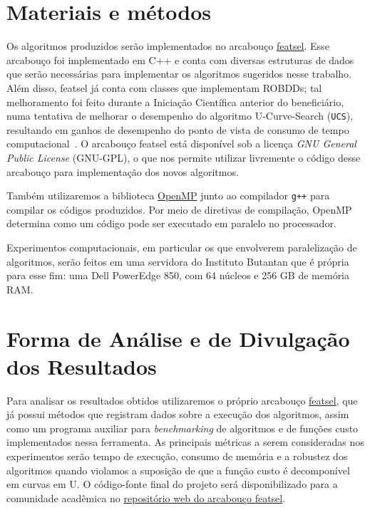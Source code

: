 \documentclass[12pt]{article}
\begin{document}
\section{Materiais e métodos}
Os algoritmos produzidos serão implementados no arcabouço \href{https://github.com/msreis/featsel}{featsel}. Esse arcabouço foi implementado em C++ e conta com diversas estruturas de dados que serão necessárias para implementar os
algoritmos sugeridos nesse trabalho. Além disso, featsel já conta com classes que implementam ROBDDs; tal melhoramento foi feito durante a Iniciação Científica anterior do beneficiário, numa tentativa de melhorar o desempenho do algoritmo U-Curve-Search ({\tt UCS}), resultando em ganhos de desempenho do ponto de vista de consumo de tempo computacional~\cite{ucsrobdd ic}. O arcabouço featsel está disponível sob a licença \textit{GNU General Public License} (GNU-GPL), o que nos permite utilizar livremente o código desse arcabouço para implementação dos novos algoritmos. 

Também utilizaremos a biblioteca \href{http://www.openmp.org/}{OpenMP} junto ao compilador {\tt g++} para compilar os códigos produzidos. Por meio de diretivas de compilação, OpenMP determina como um código pode ser executado em paralelo no processador.

Experimentos computacionais, em particular os que envolverem paralelização de algoritmos, serão feitos em uma servidora do Instituto Butantan que é própria para esse fim: uma Dell PowerEdge 850, com 64 núcleos e 256 GB de memória RAM.


\section{Forma de Análise e de Divulgação dos Resultados}

Para analisar os resultados obtidos utilizaremos o próprio arcabouço \href{https://github.com/msreis/featsel}{featsel}, que já possui métodos que registram dados sobre a execução dos algoritmos, assim como um programa auxiliar para {\em benchmarking} de algoritmos e de funções custo implementados nessa ferramenta. As principais métricas a serem consideradas nos experimentos serão tempo de execução, consumo de memória e a robustez dos algoritmos quando violamos a suposição de que a função custo é decomponível em curvas em U. O código-fonte final do projeto será disponibilizado para a comunidade acadêmica no \href{https://github.com/msreis/featsel}{repositório web do arcabouço featsel}.
\end{document}
